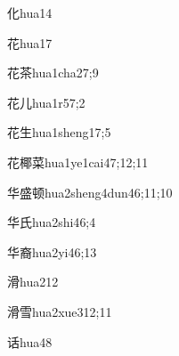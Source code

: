 \begin{verbete}{化}{hua1}{4}
\end{verbete}

\begin{verbete}{花}{hua1}{7}
\end{verbete}

\begin{verbete}{花茶}{hua1cha2}{7;9}
\end{verbete}

\begin{verbete}{花儿}{hua1r5}{7;2}
\end{verbete}

\begin{verbete}{花生}{hua1sheng1}{7;5}
\end{verbete}

\begin{verbete}{花椰菜}{hua1ye1cai4}{7;12;11}
\end{verbete}

\begin{verbete}{华盛顿}{hua2sheng4dun4}{6;11;10}
\end{verbete}

\begin{verbete}{华氏}{hua2shi4}{6;4}
\end{verbete}

\begin{verbete}{华裔}{hua2yi4}{6;13}
\end{verbete}

\begin{verbete}{滑}{hua2}{12}
\end{verbete}

\begin{verbete}{滑雪}{hua2xue3}{12;11}
\end{verbete}

\begin{verbete}{话}{hua4}{8}
\end{verbete}

